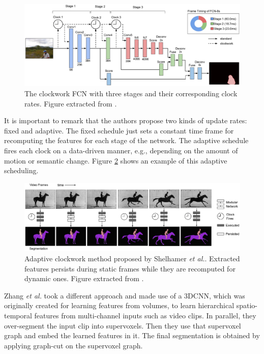 \begin{figure}[!hbt]
	\centering
	\includegraphics[width=\linewidth]{Figures/Segmentation/clockworkfcn}
	\caption{The clockwork \acs{FCN} with three stages and their corresponding clock rates. Figure extracted from \cite{Shelhamer2016}.}
	\label{fig:semseg:clockworkfcn}
\end{figure}

It is important to remark that the authors propose two kinds of update rates: fixed and adaptive. The fixed schedule just sets a constant time frame for recomputing the features for each stage of the network. The adaptive schedule fires each clock on a data-driven manner, e.g., depending on the amount of motion or semantic change. Figure \ref{fig:semseg:clockworkfcn-adaptive} shows an example of this adaptive scheduling.

\begin{figure}[!hbt]
	\centering
	\includegraphics[width=\linewidth]{Figures/Segmentation/clockworkfcn-adaptive}
	\caption{Adaptive clockwork method proposed by Shelhamer \emph{et al.}\cite{Shelhamer2016}. Extracted features persists during static frames while they are recomputed for dynamic ones. Figure extracted from \cite{Shelhamer2016}.}
	\label{fig:semseg:clockworkfcn-adaptive}
\end{figure}

Zhang \emph{et al.}\cite{Zhang2014} took a different approach and made use of a \acs{3D}\acs{CNN}, which was originally created for learning features from volumes, to learn hierarchical spatio-temporal features from multi-channel inputs such as video clips. In parallel, they over-segment the input clip into supervoxels. Then they use that supervoxel graph and embed the learned features in it. The final segmentation is obtained by applying graph-cut\cite{Boykov2001} on the supervoxel graph.

